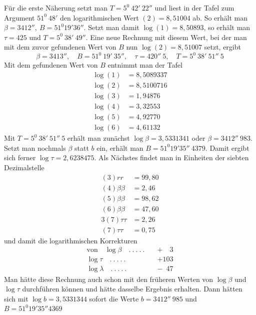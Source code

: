 %
\par\indent Für die erste Näherung setzt man \(T=5^0\ 42'\ 22''\) und liest in der Tafel zum Argument \(51^0\ 48'\) den logarithmischen Wert \((2)=8{,}51004\) ab. So erhält man \(\beta=3412'',\ B=51^0 19'36''\). Setzt man damit \(\log(1)=8{,}50893\), so erhält man \(\tau=425\) und \(T=5^0\ 38'\ 49''\). Eine neue Rechnung mit diesem Wert, bei der man mit dem zuvor gefundenen Wert von \(B\) nun \(\log(2)=8{,}51007\) setzt, ergibt
\[
\beta=3413'',\quad B=51^0\ 19'\ 35'',\quad\tau=420''\ 5,\quad T=5^0\ 38'\ 51''\ 5
\]
Mit dem gefundenen Wert von \(B\) entnimmt man der Tafel
\[
\begin{aligned}
\log(1)&=8{,}5089337\\
\log(2)&=8{,}5100716\\
\log(3)&=1{,}94876\\
\log(4)&=3{,}32553\\
\log(5)&=4{,}92770\\
\log(6)&=4{,}61132
\end{aligned}
\]
Mit \(T=5^0\ 38'\ 51''\ 5\) erhält man zunächst \(\log\beta=3{,}5331341\) oder \(\beta=3412''\ 983\). Setzt man nochmals \(\beta\) statt \(b\) ein, erhält man \(B=51^0 19'35''\ 4379\). Damit ergibt sich ferner \(\log\tau=2{,}6238475\). Als Nächstes findet man in Einheiten der siebten Dezimalstelle
\[
\begin{aligned}
(3)rr&=99{,}80\\
(4)\beta\beta&=2{,}46\\
(5)\beta\beta&=98{,}62\\
(6)\beta\beta&=47{,}60\\
3(7)\tau\tau&=2{,}26\\
(7)\tau\tau&=0{,}75
\end{aligned}
\]
und damit die logarithmischen Korrekturen
\[
\begin{aligned}
\text{von}\quad\log\beta\quad .\ .\ .\ .\ .\quad&+\phantom{10}3\\
\log\tau\quad .\ .\ .\ .\ .\quad&+103\\
\log\lambda\quad .\ .\ .\ .\ .\quad&-\phantom{1}47
\end{aligned}
\]
Man hätte diese Rechnung auch schon mit den früheren Werten von \(\log\beta\) und \(\log\tau\) durchführen können und hätte dasselbe Ergebnis erhalten. Dann hätten sich mit \(\log b=3{,}5331344\) sofort die Werte \(b=3412''\ 985\) und \(B=51^0 19'35''4369\)
